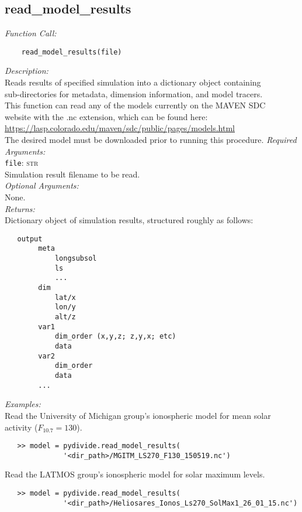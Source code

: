 \documentclass{article}
\begin{document}
\subsection{read\_model\_results}
\label{subsec:readmodelresults}
\vspace{-5mm}
\textit{Function Call:}\\
\vspace{-10mm}
\begin{verbatim}
    read_model_results(file)
\end{verbatim}
\vspace{-5mm}
\noindent
\textit{Description:}\\
\indent Reads results of specified simulation into a dictionary object containing\\
\indent sub-directories for metadata, dimension information, and model tracers.\\
\indent This function can read any of the models currently on the MAVEN SDC\\
\indent website with the .nc extension, which can be found here:\\
\indent \href{https://lasp.colorado.edu/maven/sdc/public/pages/models.html}{https://lasp.colorado.edu/maven/sdc/public/pages/models.html}\\
\indent The desired model must be downloaded prior to running this procedure.
\textit{Required Arguments:}\\
\indent \texttt{file}: \textsc{str}\\
\indent \indent Simulation result filename to be read.\\
\textit{Optional Arguments:}\\
\indent None.\\
\textit{Returns:}\\
\indent Dictionary object of simulation results, structured roughly as follows:\\
\vspace{-10mm}
\begin{verbatim}
   output
        meta
            longsubsol
            ls
            ...
        dim
            lat/x
            lon/y
            alt/z
        var1
            dim_order (x,y,z; z,y,x; etc)
            data
        var2
            dim_order
            data
        ...
\end{verbatim}
\noindent \textit{Examples:}\\
\indent Read the University of Michigan group's ionospheric model for mean solar\\
\indent activity ($F_{10.7} = 130$).
\vspace{-5mm}
\begin{verbatim}
   >> model = pydivide.read_model_results(
              '<dir_path>/MGITM_LS270_F130_150519.nc')
\end{verbatim}
\noindent
\indent Read the LATMOS group's ionospheric model for solar maximum levels.
\vspace{-5mm}
\begin{verbatim}
   >> model = pydivide.read_model_results(
              '<dir_path>/Heliosares_Ionos_Ls270_SolMax1_26_01_15.nc')
\end{verbatim}
\end{document}
